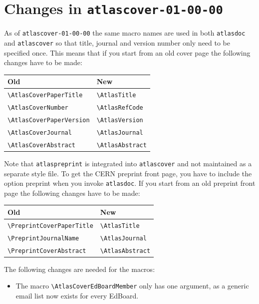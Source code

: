 \documentclass[atlasstyle,UKenglish]{latex/atlasdoc}
\newcommand{\Macro}[1]{\texttt{\textbackslash #1}\xspace}
\newcommand{\Option}[1]{\textsf{#1}\xspace}
\newcommand{\Package}[1]{\texttt{#1}\xspace}
\begin{document}
\section{Changes in \texttt{atlascover-01-00-00}}
\label{sec:oldcover}

As of \Package{atlascover-01-00-00} the same macro names are used in both \Package{atlasdoc} and
\Package{atlascover} so that title, journal and version number only need to be specified once.
This means that if you start from an old cover page the following changes have to be made:
\begin{center}
  \begin{tabular}{ll}
    Old                            & New                   \\
    \midrule
    \Macro{AtlasCoverPaperTitle}   & \Macro{AtlasTitle}    \\
    \Macro{AtlasCoverNumber}       & \Macro{AtlasRefCode}  \\
    \Macro{AtlasCoverPaperVersion} & \Macro{AtlasVersion}  \\
    \Macro{AtlasCoverJournal}      & \Macro{AtlasJournal}  \\
    \Macro{AtlasCoverAbstract}     & \Macro{AtlasAbstract}
  \end{tabular}
\end{center}

Note that \Package{atlaspreprint} is integrated into \Package{atlascover} and not maintained as a separate style file.
To get the CERN preprint front page, you have to include the option \Option{preprint} when you invoke \Package{atlasdoc}.
If you start from an old preprint front page the following changes have to be made:
\begin{center}
  \begin{tabular}{ll}
    Old                              & New                   \\
    \midrule
    \Macro{PreprintCoverPaperTitle} & \Macro{AtlasTitle}    \\
    \Macro{PreprintJournalName}     & \Macro{AtlasJournal}  \\
    \Macro{PreprintCoverAbstract}   & \Macro{AtlasAbstract}
  \end{tabular}
\end{center}
The following changes are needed for the macros:
\begin{itemize}
\item The macro \Macro{AtlasCoverEdBoardMember} only has one argument, as a generic email list now exists for every EdBoard.
\end{itemize}
\end{document}

